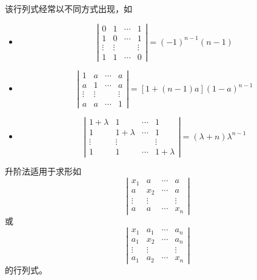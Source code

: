 \documentclass[10pt,a4paper%
tablecaptionabove]{article}
\newcommand{\cd}{\cdots}
\newcommand{\vd}{\vdots}
\begin{document}
\begin{CJK}{UTF8}{gkai}
\begin{zhu}
  该行列式经常以不同方式出现，如
  \begin{itemize}
  \item
    $$
    \left|
      \begin{array}{cccc}
        0  &  1  & \cd & 1   \\
        1  &  0  & \cd & 1   \\
        \vd& \vd &     & \vd \\
        1  &  1  & \cd & 0 
      \end{array}
    \right|   = (-1)^{n-1}(n-1)
    $$ 
  \item
    $$
    \left|
      \begin{array}{cccc}
        1  &  a  & \cd & a   \\
        a  &  1  & \cd & a   \\
        \vd& \vd &     & \vd \\
        a  &  a  & \cd & 1
      \end{array}
    \right| 
    = [1+(n-1)a](1-a)^{n-1}
    $$ 
  \item
    $$
    \left|
      \begin{array}{cccc}
        1+\lambda  &  1  & \cd & 1   \\
        1  &  1+\lambda  & \cd & 1   \\
        \vd& \vd &     & \vd \\
        1  &  1  & \cd & 1+\lambda 
      \end{array}
    \right| 
    = (\lambda+n)\lambda^{n-1}
    $$
  \end{itemize}

  升阶法适用于求形如
  $$
  \left|
    \begin{array}{cccc}
      x_1 &  a  & \cd & a   \\
      a   & x_2 & \cd & a   \\
      \vd & \vd &     & \vd \\
      a   &  a  & \cd & x_n
    \end{array}
  \right|
  $$
  或
  $$
  \left|
    \begin{array}{cccc}
      x_1 & a_1  & \cd & a_n   \\
      a_1 & x_2 & \cd  & a_n   \\
      \vd & \vd &     & \vd \\
      a_1 & a_2  & \cd & x_n
    \end{array}
  \right|
  $$      
  的行列式。
\end{zhu}


\end{CJK}
\end{document}
